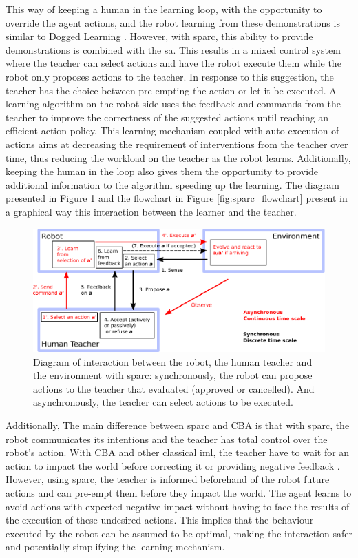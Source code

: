 This way of keeping a human in the learning loop, with the opportunity to override the agent actions, and the robot learning from these demonstrations is similar to Dogged Learning \citep{grollman2007dogged}. However, with \gls{sparc}, this ability to provide demonstrations is combined with the \gls{sa}. This results in a mixed control system where the teacher can select actions and have the robot execute them while the robot only proposes actions to the teacher. In response to this suggestion, the teacher has the choice between pre-empting the action or let it be executed. A learning algorithm on the robot side uses the feedback and commands from the teacher to improve the correctness of the suggested actions until reaching an efficient action policy. This learning mechanism coupled with auto-execution of actions aims at decreasing the requirement of interventions from the teacher over time, thus reducing the workload on the teacher as the robot learns. Additionally, keeping the human in the loop also gives them the opportunity to provide additional information to the algorithm speeding up the learning. The diagram presented in Figure \ref{fig:sparc_diagram} and the flowchart in Figure \ref{fig:sparc_flowchart} present in a graphical way this interaction between the learner and the teacher.

\begin{figure}[ht]
	\includegraphics[width=1\linewidth]{diagram.pdf}
	\centering
	\caption{Diagram of interaction between the robot, the human teacher and the environment with \gls{sparc}: synchronously, the robot can propose actions to the teacher that evaluated (approved or cancelled). And asynchronously, the teacher can select actions to be executed.}
	\label{fig:sparc_diagram}
\end{figure}

Additionally, The main difference between \gls{sparc} and CBA \citep{chernova2009interactive} is that with \gls{sparc}, the robot communicates its intentions and the teacher has total control over the robot's action. With CBA and other classical \gls{iml}, the teacher have to wait for an action to impact the world before correcting it or providing negative feedback \citep{thomaz2008teachable,knox2009interactively}. However, using \gls{sparc}, the teacher is informed beforehand of the robot future actions and can pre-empt them before they impact the world. The agent learns to avoid actions with expected negative impact without having to face the results of the execution of these undesired actions. This implies that the behaviour executed by the robot can be assumed to be optimal, making the interaction safer and potentially simplifying the learning mechanism.

